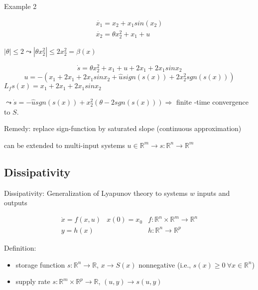 Example 2
\begin{Example}
\begin{equation*}
\begin{array}{l}
     \dot{x_1} = x_2 + x_1 sin(x_2)\\
     \dot{x_2} = \theta x_2^2 + x_1 + u
\end{array}
\end{equation*}

$|\theta| \leq 2 \leadsto |\theta x_2^2| \leq 2x_2^2 = \beta(x)$

\begin{equation*}
\dot{s} = \theta x_2^2 + x_1 +u +2x_1 +2x_1sinx_2
\end{equation*}
\begin{equation*}
u = -(x_1 +2x_1 +2x_1sinx_2 + \hat{u}sign(s(x)) + 2x_2^2sgn(s(x)))
\end{equation*}
$L_fs(x) = x_1 +2x_1 +2x_1sinx_2$

$\leadsto \dot{s} = - \hat{u}sgn(s(x)) + x_2^2(\theta - 2sgn(s(x))) \Rightarrow$ finite -time convergence to $S$.
\end{Example}


Remedy: replace sign-function by saturated slope (continuous approximation)

can be extended to multi-input systems $u \in \mathbb{R}^m \to s: \mathbb{R}^n \to \mathbb{R}^m$

\subsection{Dissipativity}


Dissipativity: Generalization of Lyapunov theory to systems $w$ inputs and outputs

\begin{equation}\label{input-output}
\begin{array}{lll}
     \dot{x} = f(x,u) & x(0) = x_0 & f: \mathbb{R}^n \times \mathbb{R}^m \to \mathbb{R}^n \\
     y = h(x) & & h: \mathbb{R}^n \to \mathbb{R}^p
\end{array}
\end{equation}

Definition: 
\begin{itemize}
\item storage function $s: \mathbb{R}^n \to \mathbb{R}$, $x \to S(x)$ nonnegative (i.e., $s(x) \geq 0 \ \forall x \in \mathbb{R}^n$)
\item supply rate $s: \mathbb{R}^m \times \mathbb{R}^p \to \mathbb{R}$, $(u,y) \to s(u,y)$
\end{itemize}

